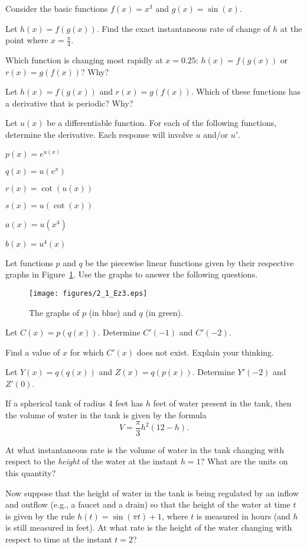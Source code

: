 \begin{exercises} 
\item Consider the basic functions $f(x) = x^3$ and $g(x) = \sin(x)$.
\ba
	\item Let $h(x) = f(g(x))$.  Find the exact instantaneous rate of change of $h$ at the point where $x = \frac{\pi}{4}.$
	\item Which function is changing most rapidly at $x = 0.25$:  $h(x) = f(g(x))$ or $r(x) = g(f(x))$?  Why?
	\item Let $h(x) = f(g(x))$ and $r(x) = g(f(x))$.  Which of these functions has a derivative that is periodic?  Why?
\ea
\item Let $u(x)$ be a differentiable function.  For each of the following functions, determine the derivative.  Each response will involve $u$ and/or $u'$.
\ba
	\item $p(x) = e^{u(x)}$
	\item $q(x) = u(e^x)$
	\item $r(x) = \cot(u(x))$
	\item $s(x) = u(\cot(x))$
	\item $a(x) = u(x^4)$
	\item $b(x) = u^4(x)$
\ea
\item Let functions $p$ and $q$ be the piecewise linear functions given by their respective graphs in Figure~\ref{F:2.5.Ez3}.  Use the graphs to answer the following questions.
\begin{figure}[h]
\begin{center}
\texttt{[image: figures/2\_1\_Ez3.eps]}
\caption{The graphs of $p$ (in blue) and $q$ (in green).} \label{F:2.5.Ez3}
\end{center}
\end{figure}
\ba
	\item Let $C(x) = p(q(x))$.  Determine $C'(-1)$ and $C'(-2)$.
	\item Find a value of $x$ for which $C'(x)$ does not exist.  Explain your thinking.
	\item Let $Y(x) = q(q(x))$ and $Z(x) = q(p(x))$.  Determine $Y'(-2)$ and $Z'(0)$.	
\ea
\item If a spherical tank of radius 4 feet has $h$ feet of water present in the tank, then the volume of water in the tank is given by the formula
$$V = \frac{\pi}{3} h^2(12-h).$$
\ba
	\item At what instantaneous rate is the volume of water in the tank changing with respect to the \emph{height} of the water at the instant $h = 1$?  What are the units on this quantity?
	\item Now suppose that the height of water in the tank is being regulated by an inflow and outflow (e.g., a faucet and a drain) so that the height of the water at time $t$ is given by the rule $h(t) = \sin(\pi t) + 1$, where $t$ is measured in hours (and $h$ is still measured in feet).  At what rate is the height of the water changing with respect to time at the instant $t = 2$?

\end{exercises}
